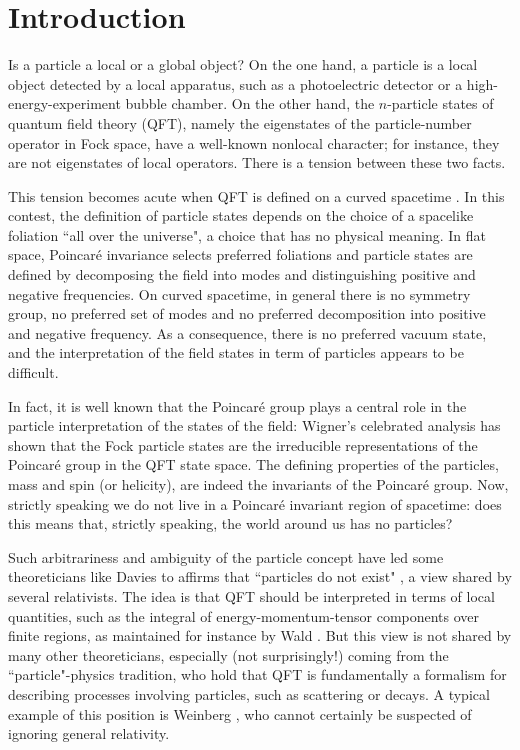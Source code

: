 \documentclass[10pt, nofootinbib]{revtex4}
\begin{document}
\section{Introduction}


Is a particle a local or a global object?  On the one hand, a particle
is a local object detected by a local apparatus, such as a
photoelectric detector or a high-energy-experiment bubble chamber.  On
the other hand, the $n$-particle states of quantum field theory (QFT),
namely the eigenstates of the particle-number operator in Fock space,
have a well-known nonlocal character; for instance, they are not
eigenstates of local operators.  There is a tension between these two
facts.

This tension becomes acute when QFT is defined on a
curved spacetime \cite{bd,wald}.  In this contest, the definition of
particle states depends on the choice of a spacelike foliation ``all
over the universe", a choice that has no physical meaning.  In flat 
space, Poincar\'e invariance selects 
preferred foliations and particle states are defined by decomposing
the field into modes and distinguishing positive and negative
frequencies.  On curved spacetime, in general there is no 
symmetry group, no preferred set of 
modes and no preferred decomposition into
positive and negative frequency.  As a consequence, there is no
preferred vacuum state, and the interpretation of the field states in
term of particles appears to be difficult.  

In fact, it is well known that the Poincar\'{e} group plays a central
role in the particle interpretation of the states of the field:
Wigner's celebrated analysis \cite{wigner} has shown that the Fock
particle states are the irreducible representations of the Poincar\'{e} group
in the QFT state space.  The defining properties of the particles,
mass and spin (or helicity), are indeed the invariants of the
Poincar\'e group.  Now, strictly speaking we do not live in a
Poincar\'e invariant region of spacetime: does this means that,
strictly speaking, the world around us has no particles?

Such arbitrariness and ambiguity of the particle concept have led some
theoreticians like Davies to affirms that ``particles do not exist"
\cite{Davies}, a view shared by several relativists.  The idea is that
QFT should be interpreted in terms of local quantities, such as the
integral of energy-momentum-tensor components over finite regions, as
maintained for instance by Wald \cite{wald}.  But this view is not
shared by many other theoreticians, especially (not surprisingly!)  coming
from the ``particle"-physics tradition, who hold that QFT is
fundamentally a formalism for describing processes involving
particles, such as scattering or decays.  A typical example of this
position is Weinberg \cite{weinberg}, who cannot certainly be suspected
of ignoring general relativity.
\end{document}

